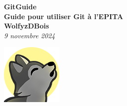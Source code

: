 \begin{center}

    \vspace{15px}
    \Huge{\textbf{GitGuide}}\\
	\huge{\textbf{Guide pour utiliser Git à l'EPITA}}\\
	\vspace{10px}
	\Large{\textbf{WolfyzDBois}}\\
	\textit{9 novembre 2024}

    \vspace{25px}
	\includegraphics{img/wolf.png}
	
\end{center}
